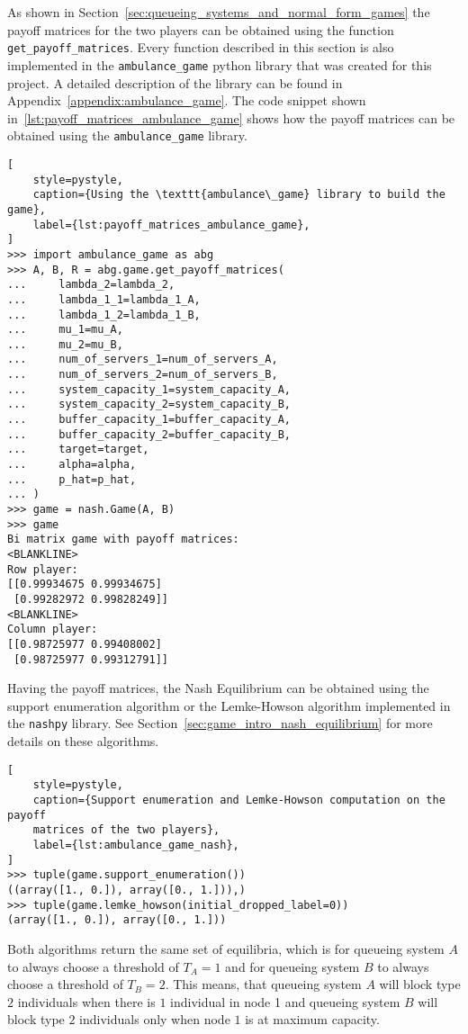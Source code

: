 As shown in Section~\ref{sec:queueing_systems_and_normal_form_games} the payoff
matrices for the two players can be obtained using the function
\texttt{get\_payoff\_matrices}.
Every function described in this section is also implemented in the
\texttt{ambulance\_game} python library that was created for
this project.
A detailed description of the library can be found in
Appendix~\ref{appendix:ambulance_game}.
The code snippet shown in~\ref{lst:payoff_matrices_ambulance_game} shows how the
payoff matrices can be obtained using the
\texttt{ambulance\_game} library.

\begin{lstlisting}[
    style=pystyle,
    caption={Using the \texttt{ambulance\_game} library to build the game},
    label={lst:payoff_matrices_ambulance_game},
]
>>> import ambulance_game as abg
>>> A, B, R = abg.game.get_payoff_matrices(
...     lambda_2=lambda_2,
...     lambda_1_1=lambda_1_A,
...     lambda_1_2=lambda_1_B,
...     mu_1=mu_A,
...     mu_2=mu_B,
...     num_of_servers_1=num_of_servers_A,
...     num_of_servers_2=num_of_servers_B,
...     system_capacity_1=system_capacity_A,
...     system_capacity_2=system_capacity_B,
...     buffer_capacity_1=buffer_capacity_A,
...     buffer_capacity_2=buffer_capacity_B,
...     target=target,
...     alpha=alpha,
...     p_hat=p_hat,
... )
>>> game = nash.Game(A, B)
>>> game
Bi matrix game with payoff matrices:
<BLANKLINE>
Row player:
[[0.99934675 0.99934675]
 [0.99282972 0.99828249]]
<BLANKLINE>
Column player:
[[0.98725977 0.99408002]
 [0.98725977 0.99312791]]

\end{lstlisting}

Having the payoff matrices, the Nash Equilibrium can be obtained using the
support enumeration algorithm or the Lemke-Howson algorithm implemented in the
\texttt{nashpy} library.
See Section~\ref{sec:game_intro_nash_equilibrium} for more details on these
algorithms.

\begin{lstlisting}[
    style=pystyle,
    caption={Support enumeration and Lemke-Howson computation on the payoff
    matrices of the two players},
    label={lst:ambulance_game_nash},
]
>>> tuple(game.support_enumeration())
((array([1., 0.]), array([0., 1.])),)
>>> tuple(game.lemke_howson(initial_dropped_label=0))
(array([1., 0.]), array([0., 1.]))

\end{lstlisting}

Both algorithms return the same set of equilibria, which is for queueing system
\(A\) to always choose a threshold of \(T_A = 1\) and for queueing system
\(B\) to always choose a threshold of \(T_B = 2\).
This means, that queueing system \(A\) will block type \(2\) individuals when
there is \(1\) individual in node 1 and queueing system \(B\) will block type
\(2\) individuals only when node \(1\) is at maximum capacity.

